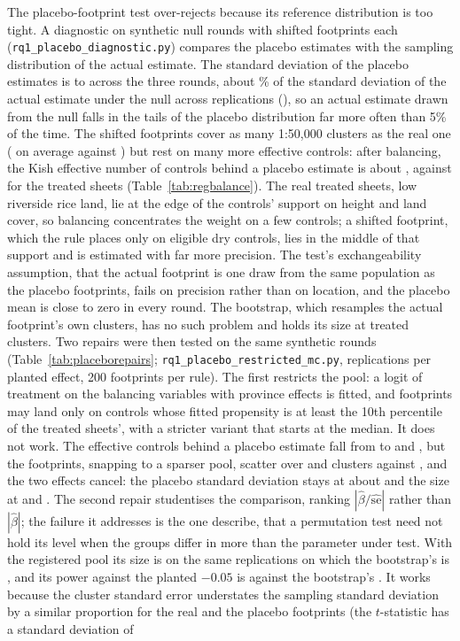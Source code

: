 The placebo-footprint test over-rejects because its reference distribution is too tight. A diagnostic on \pdxDraws{} synthetic null rounds with \pdxFootprints{} shifted footprints each (\texttt{rq1\_placebo\_diagnostic.py}) compares the placebo estimates with the sampling distribution of the actual estimate. The standard deviation of the placebo estimates is \pdxPlaceboSdLo{} to \pdxPlaceboSdHi{} across the three rounds, about \pdxSdRatio\% of the standard deviation of the actual estimate under the null across replications (\mcxNullSd), so an actual estimate drawn from the null falls in the tails of the placebo distribution far more often than 5\% of the time. The shifted footprints cover as many 1:50,000 clusters as the real one (\pdxPlaceboClusters{} on average against \pdxActualClusters) but rest on many more effective controls: after balancing, the Kish effective number of controls behind a placebo estimate is about \pdxPlaceboEss, against \pdxActualEss{} for the treated sheets (Table~\ref{tab:regbalance}). The real treated sheets, low riverside rice land, lie at the edge of the controls' support on height and land cover, so balancing concentrates the weight on a few controls; a shifted footprint, which the rule places only on eligible dry controls, lies in the middle of that support and is estimated with far more precision. The test's exchangeability assumption, that the actual footprint is one draw from the same population as the placebo footprints, fails on precision rather than on location, and the placebo mean is close to zero in every round. The bootstrap, which resamples the actual footprint's own clusters, has no such problem and holds its size at \radarTreatedClusters{} treated clusters. Two repairs were then tested on the same synthetic rounds (Table~\ref{tab:placeborepairs}; \texttt{rq1\_placebo\_restricted\_mc.py}, \prxReps{} replications per planted effect, 200 footprints per rule). The first restricts the pool: a logit of treatment on the balancing variables with province effects is fitted, and footprints may land only on controls whose fitted propensity is at least the 10th percentile of the treated sheets', with a stricter variant that starts at the median. It does not work. The effective controls behind a placebo estimate fall from \prxRegEss{} to \prxResEss{} and \prxStrEss, but the footprints, snapping to a sparser pool, scatter over \prxResClusters{} and \prxStrClusters{} clusters against \prxRegClusters, and the two effects cancel: the placebo standard deviation stays at about \prxResSd{} and the size at \prxNullRes{} and \prxNullStr. The second repair studentises the comparison, ranking $|\hat\beta / \widehat{\mathrm{se}}|$ rather than $|\hat\beta|$; the failure it addresses is the one \citet{chung2013studentised} describe, that a permutation test need not hold its level when the groups differ in more than the parameter under test. With the registered pool its size is \prxNullRegT{} on the same replications on which the bootstrap's is \prxNullWcb{}, and its power against the planted $-0.05$ is \prxEffRegT{} against the bootstrap's \prxEffWcb. It works because the cluster standard error understates the sampling standard deviation by a similar proportion for the real and the placebo footprints (the $t$-statistic has a standard deviation of 